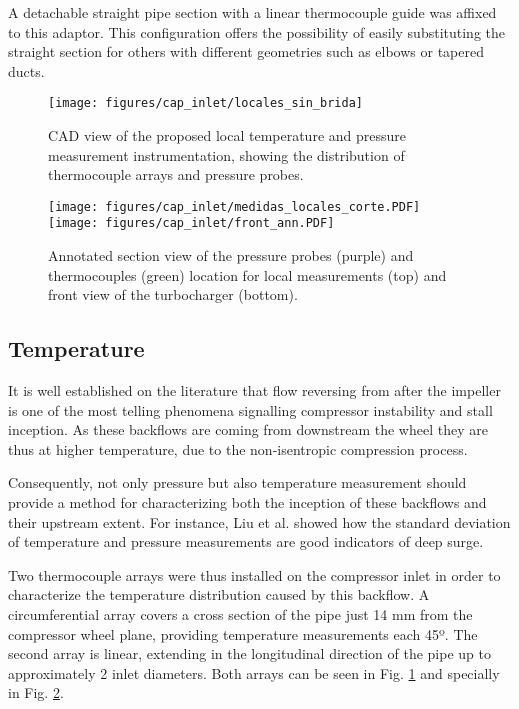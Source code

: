 A detachable straight pipe section with a linear thermocouple guide was affixed to this adaptor. This configuration offers the possibility of easily substituting the straight section for others with different geometries such as elbows or tapered ducts.

\begin{figure}[htb!]
\centering
\texttt{[image: figures/cap\_inlet/locales\_sin\_brida]}
\caption{CAD view of the proposed local temperature and pressure measurement instrumentation, showing the distribution of thermocouple arrays and pressure probes.}
\label{fig:metod_local_meas}
\end{figure}

\begin{figure}[b!]
\centering
\texttt{[image: figures/cap\_inlet/medidas\_locales\_corte.PDF]}
\texttt{[image: figures/cap\_inlet/front\_ann.PDF]}
\caption{Annotated section view of the pressure probes (purple) and thermocouples (green) location for local measurements (top) and front view of the turbocharger (bottom).}
\label{fig:metod_local_meas_dimen}
\end{figure}

\subsection{Temperature}

It is well established on the literature \cite{koff1986axisymmetrically,galindo2008experiments} that flow reversing from after the impeller is one of the most telling phenomena signalling compressor instability and stall inception. As these backflows are coming from downstream the wheel they are thus at higher temperature, due to the non-isentropic compression process.

Consequently, not only pressure but also temperature measurement should provide a method for characterizing both the inception of these backflows and their upstream extent. For instance, Liu et al. \cite{liu2013methods} showed how the standard deviation of temperature and pressure measurements are good indicators of deep surge.

Two thermocouple arrays were thus installed on the compressor inlet in order to characterize the temperature distribution caused by this backflow. A circumferential array covers a cross section of the pipe just 14 mm from the compressor wheel plane, providing temperature measurements each 45º. The second array is linear, extending in the longitudinal direction of the pipe up to approximately 2 inlet diameters. Both arrays can be seen in Fig. \ref{fig:metod_local_meas} and specially in Fig. \ref{fig:metod_local_meas_dimen}.

